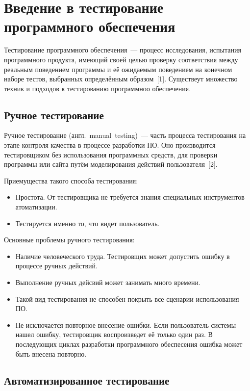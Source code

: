 \section{Введение в тестирование программного обеспечения} \label{section_1}

Тестирование программного обеспечения~--- процесс исследования, испытания программного продукта, имеющий своей целью проверку соответствия между реальным поведением программы и её ожидаемым поведением на конечном наборе тестов, выбранных определённым образом~[1]. Существеут множество техник и подходов к тестированию программноо обеспечения.  

\subsection{Ручное тестирование} \label{subsection_11}

Ручное тестирование (англ.~manual~testing)~--- часть процесса тестирования на этапе контроля качества в процессе разработки ПО. Оно производится тестировщиком без использования программных средств, для проверки программы или сайта путём моделирования действий пользователя~[2]. 

Приемущества такого способа тестирования:

\begin{itemize}
	\item Простота. От тестировщика не требуется знания специальных инструментов атоматизации.
	\item Тестируется именно то, что видет пользователь.
\end{itemize} 

Основные проблемы ручного тестирования:
\begin{itemize}
	\item Наличие человеческого труда. Тестировщих может допустить ошибку в процессе ручных действий.
	\item Выполнение ручных дейсвий может занимать много времени.
	\item Такой вид тестирования не способен покрыть все сценарии использования ПО. 
	\item Не исключается повторное внесение ошибки. Если пользователь системы нашел ошибку, тестировщик воспроизведет её только один раз. В последующих циклах разработки программного обеспесения ошибка может быть внесена повторно.
\end{itemize} 


\subsection{Автоматизированное тестирование} \label{subsection_12}
 
